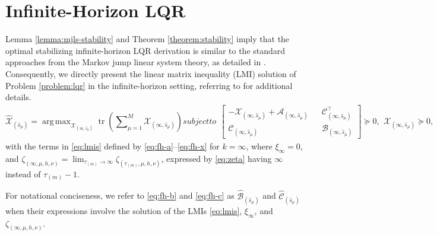\documentclass[journal,twoside,web]{ieeecolor}
\begin{document}
\section{Infinite-Horizon LQR}\label{sec:lqr-ih}
Lemma \ref{lemma:mjls-stability} and Theorem \ref{theorem:stability} imply that the optimal stabilizing infinite-horizon LQR derivation is similar to the standard approaches from the Markov jump linear system theory, as detailed in \cite{yZL-2025-automatica}. Consequently, we directly present the linear matrix inequality (LMI) solution of Problem \ref{problem:lqr} in the infinite-horizon setting, referring to \cite{yZL-2025-automatica} for additional details.
\begin{subequations}\label{eq:lmis}
\begin{equation}\label{eq:lmi-sol}
    \hat{\mathcal{X}}_{(\hat{s}_{\mu})} = \mathop{\mathrm{arg\,max}}_{\mathcal{X}_{(\infty,\hat{s}_{\mu})}} 
    \mathop{\mathrm{tr}}\left(\sum\nolimits_{\mu=1}^{M}\mathcal{X}_{(\infty,\hat{s}_{\mu})}\right) 
\end{equation}
subject to
\begin{align}\label{eq:lmi-core}
    \begin{bmatrix}
        -\mathcal{X}_{(\infty,\hat{s}_{\mu})} + \mathcal{A}_{(\infty,\hat{s}_{\mu})} & & \mathcal{C}_{(\infty,\hat{s}_{\mu})}^{\top} \\
        \mathcal{C}_{(\infty,\hat{s}_{\mu})} & & \mathcal{B}_{(\infty,\hat{s}_{\mu})}
    \end{bmatrix} \succeq 0,
\end{align}
\begin{equation}\label{eq:lmi-supp}
    \mathcal{X}_{(\infty,\hat{s}_{\mu})}\succeq 0, \quad \mathcal{B}_{(\infty,\hat{s}_{\mu})} \succ 0, 
\end{equation}
\end{subequations}
with the terms in \eqref{eq:lmis} defined by \eqref{eq:fh-a}--\eqref{eq:fh-x} for $k=\infty$, where
$\xi_{\infty} = 0$, and $\zeta_{(\infty,\mu,h,\nu)}=\lim_{\tau_{(m)}\to\infty}\zeta_{(\tau_{(m)},\mu,h,\nu)}$, expressed by \eqref{eq:zeta} having $\infty$ instead of $\tau_{(m)}-1$.

For notational conciseness, we refer to \eqref{eq:fh-b} and \eqref{eq:fh-c} as $\hat{\mathcal{B}}_{(\hat{s}_{\mu})}$ and $\hat{\mathcal{C}}_{(\hat{s}_{\mu})}$ when their expressions involve the solution of the LMIs \eqref{eq:lmis}, $\xi_{\infty}$, and $\zeta_{(\infty,\mu,h,\nu)}$.
\end{document}
